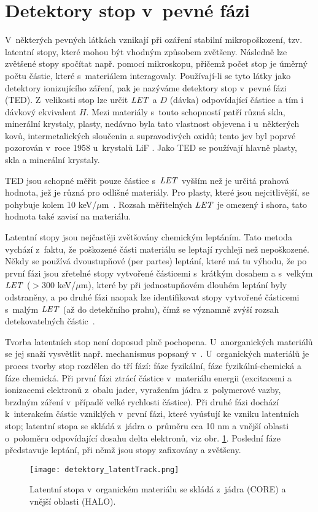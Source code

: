 \section{Detektory stop v~pevné fázi}
V~některých pevných látkách vznikají při ozáření stabilní mikropoškození, tzv. latentní stopy, které mohou být vhodným způsobem zvětšeny. Následně lze zvětšené stopy spočítat např. pomocí mikroskopu, přičemž počet stop je úměrný počtu částic, které s~materiálem interagovaly. Používají-li se tyto látky jako detektory ionizujícího záření, pak je nazýváme detektory stop v~pevné fázi (TED). Z~velikosti stop lze určit $\mathit{LET}$ a $D$ (dávka) odpovídající částice a tím i dávkový ekvivalent $H$. Mezi materiály s~touto schopností patří různá skla, minerální krystaly, plasty, nedávno byla tato vlastnost objevena i u~některých kovů, intermetalických sloučenin a supravodivých oxidů; tento jev byl poprvé pozorován v~roce 1958 u~krystalů LiF \cite{objevTED}. Jako TED
se používají hlavně plasty, skla a minerální krystaly.

TED jsou schopné měřit pouze částice s~$\mathit{LET}$ vyšším než je určitá prahová hodnota, jež je různá pro odlišné materiály. Pro plasty, které jsou nejcitlivější, se pohybuje kolem 10 keV/$\mu$m~\cite{ambrozova_dvaExperimenty}. Rozsah měřitelných $\mathit{LET}$ je omezený i shora, tato hodnota také zavisí na materiálu.  

Latentní stopy jsou nejčastěji zvětšovány chemickým leptáním. Tato metoda vychází z~faktu, že poškozené části materiálu se leptají rychleji než nepoškozené. Někdy se používá dvoustupňové (per partes) leptání, které má tu výhodu, že po první fázi jsou zřetelné stopy vytvořené částicemi s~krátkým dosahem a s~velkým $\mathit{LET}$ ($> 300$ keV/$\mu$m), které by při jednostupňovém dlouhém leptání byly odstraněny, a po druhé fázi naopak lze identifikovat stopy vytvořené částicemi s~malým $\mathit{LET}$ (až do detekčního prahu), čímž se významně zvýší rozsah detekovatelných částic~\cite{cesky}. 

Tvorba latentních stop není doposud plně pochopena. U~anorganických materiálů se jej snaží vysvětlit např. mechanismus popsaný v~\cite{spikeModel}. U~organických materiálů je proces tvorby stop rozdělen do tří fází: fáze fyzikální, fáze fyzikální-chemická a fáze chemická. Při první fázi ztrácí částice v~materiálu energii (excitacemi a ionizacemi elektronů z~obalu jader, vyražením jádra z~polymerové vazby, brzdným záření v~případě velké rychlosti částice). Při druhé fázi dochází k~interakcím částic vzniklých v~první fázi, které vyúsťují ke vzniku latentních stop; latentní stopa se skládá z~jádra o~průměru cca 10 nm a vnější oblasti o~poloměru odpovídající dosahu delta elektronů, viz obr. \ref{fig:detektory_latentTrack}. Poslední fáze představuje leptání, při němž jsou stopy zafixovány
a zvětšeny.~\cite{thesisKPBrabcova} 
\begin{figure}[h]
  \centering
  \texttt{[image: detektory\_latentTrack.png]}
  \caption{Latentní stopa v~organickém materiálu se skládá z~jádra (CORE) a vnější oblasti (HALO). \cite{thesisKPBrabcova}}
  \label{fig:detektory_latentTrack}
\end{figure}

